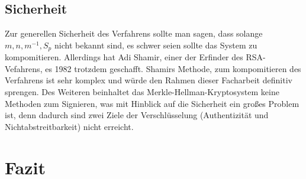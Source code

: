 \documentclass[a4paper,12pt,titlepage]{article}
\begin{document}
\subsection{Sicherheit}
Zur generellen Sicherheit des Verfahrens sollte man sagen, dass solange $m, n, m^{-1}, S_p$ nicht bekannt sind, es schwer seien sollte das System zu kompomitieren. Allerdings hat Adi Shamir, einer der Erfinder des RSA-Vefahrens, es 1982 trotzdem geschafft. Shamirs Methode, zum kompomitieren des Verfahrens ist sehr komplex und würde den Rahmen dieser Facharbeit definitiv sprengen. Des Weiteren beinhaltet das Merkle-Hellman-Kryptosystem keine Methoden zum Signieren, was mit Hinblick auf die Sicherheit ein großes Problem ist, denn dadurch sind zwei Ziele der Verschlüsselung (Authentizität und Nichtabstreitbarkeit) nicht erreicht. %



\newpage
\section{Fazit}
\cite{delfs_knebl} \cite{oneway_lukas} \cite{asymm_gesch} \cite{martin_bio} \cite{ralph_bio} \cite{schlusselverteilung} \cite{merklehellman_neer}\cite{fa_asymm_hendrik}
\newpage


\begin{flushleft}

\end{flushleft}
\end{document}

